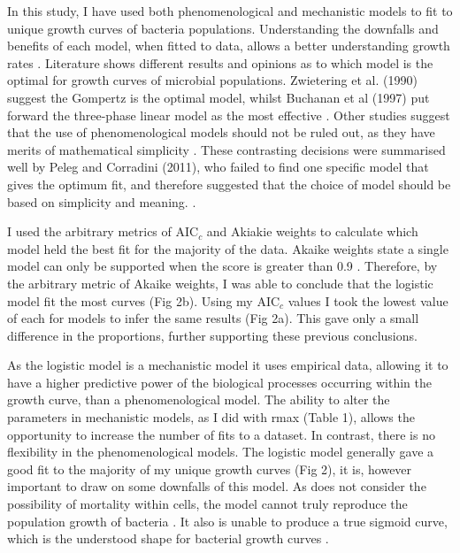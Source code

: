 \documentclass[11pt]{article}
\begin{document}
In this study, I have used both phenomenological and mechanistic models to fit to unique growth curves of bacteria populations. Understanding the downfalls and benefits of each model, when fitted to data, allows a better understanding growth rates \cite{zwietering_modeling_1990}.  Literature shows different results and opinions as to which model is the optimal for growth curves of microbial populations. Zwietering et al. (1990) suggest the Gompertz is the optimal model, whilst Buchanan et al (1997) put forward the three-phase linear model as the most effective \cite{zwietering_modeling_1990,buchanan_when_1997}. Other studies suggest that the use of phenomenological models should not be ruled out, as they have merits of mathematical simplicity \cite{smith-simpson_estimating_2007}. These contrasting decisions were summarised well by Peleg and Corradini (2011), who failed to find one specific model that gives the optimum fit, and therefore suggested that the choice of model should be based on simplicity and meaning. \cite{peleg_microbial_2011}. 

I used the arbitrary metrics of AIC$_c$ and Akiakie weights to calculate which model held the best fit for the majority of the data. Akaike weights state a single model can only be supported when the score is greater than 0.9 \cite{johnson_model_2004}. Therefore, by the arbitrary metric of Akaike weights, I was able to conclude that the logistic model fit the most curves (Fig 2b). Using my AIC$_c$ values I took the lowest value of each for models to infer the same results (Fig 2a). This gave only a small difference in the proportions, further supporting these previous conclusions. 

As the logistic model is a mechanistic model it uses empirical data, allowing it to have a higher predictive power of the biological processes occurring within the growth curve, than a phenomenological model. The ability to alter the parameters in mechanistic models, as I did with r\textunderscore max (Table 1), allows the opportunity to increase the number of fits to a dataset. In contrast, there is no flexibility in the phenomenological models. The logistic model generally gave a good fit to the majority of my unique growth curves (Fig 2), it is, however important to draw on some downfalls of this model. As does not consider the possibility of mortality within cells, the model cannot truly reproduce the population growth of bacteria \cite{peleg_microbial_2011}.  It also is unable to produce a true sigmoid curve, which is the understood shape for bacterial growth curves \cite{fujikawa_new_2004}. 
\end{document}
